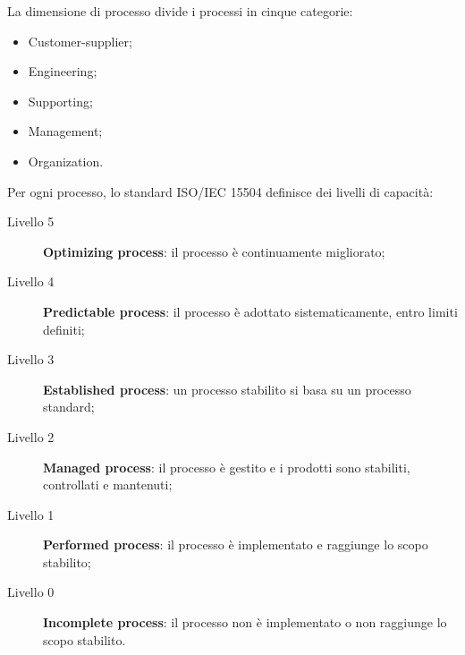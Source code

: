 \documentclass[PianoDiQualifica.tex]{subfiles}
\begin{document}
\begin{appendices}
		La dimensione di processo divide i processi in cinque categorie:
		\begin{itemize}
			\item Customer-supplier;
			\item Engineering;
			\item Supporting;
			\item Management;
			\item Organization.
		\end{itemize}
		
		Per ogni processo, lo standard ISO/IEC 15504 definisce dei livelli di capacità:
		\begin{description}
			\item [\normalfont Livello 5] \textbf{Optimizing process}: il processo è continuamente migliorato;
			\item [\normalfont Livello 4] \textbf{Predictable process}: il processo è adottato sistematicamente, entro limiti definiti;
			\item [\normalfont Livello 3] \textbf{Established process}: un processo stabilito si basa su un processo standard;
			\item [\normalfont Livello 2] \textbf{Managed process}: il processo è gestito e i prodotti sono stabiliti, controllati e mantenuti;
			\item [\normalfont Livello 1] \textbf{Performed process}: il processo è implementato e raggiunge lo scopo stabilito;
			\item [\normalfont Livello 0] \textbf{Incomplete process}: il processo non è implementato o non raggiunge lo scopo stabilito.\\
		\end{description}
		

\end{appendices}
\end{document}
